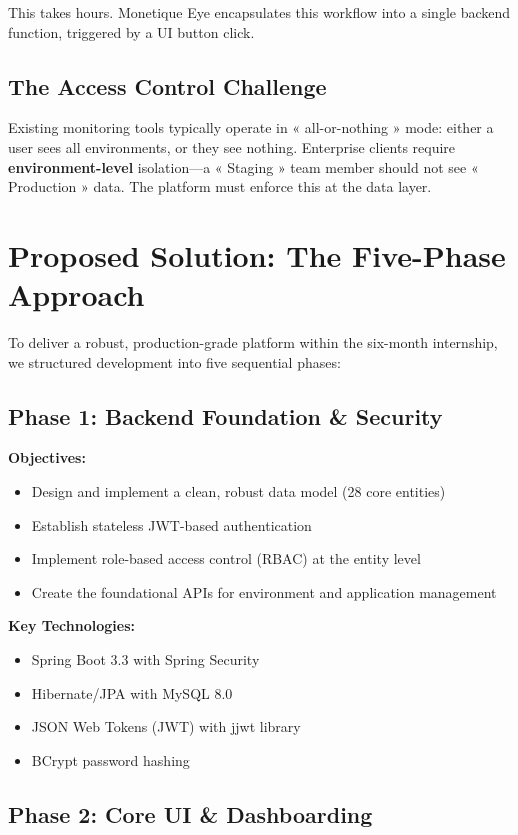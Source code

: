\documentclass[12pt,a4paper]{report}
\begin{document}
This takes hours. Monetique Eye encapsulates this workflow into a single backend function, triggered by a UI button click.

\subsection{The Access Control Challenge}

Existing monitoring tools typically operate in « all-or-nothing » mode: either a user sees all environments, or they see nothing. Enterprise clients require \textbf{environment-level} isolation—a « Staging » team member should not see « Production » data. The platform must enforce this at the data layer.

\section{Proposed Solution: The Five-Phase Approach}

To deliver a robust, production-grade platform within the six-month internship, we structured development into five sequential phases:

\subsection{Phase 1: Backend Foundation \& Security}

\textbf{Objectives:}
\begin{itemize}
  \item Design and implement a clean, robust data model (28 core entities)
  \item Establish stateless JWT-based authentication
  \item Implement role-based access control (RBAC) at the entity level
  \item Create the foundational APIs for environment and application management
\end{itemize}

\textbf{Key Technologies:}
\begin{itemize}
  \item Spring Boot 3.3 with Spring Security
  \item Hibernate/JPA with MySQL 8.0
  \item JSON Web Tokens (JWT) with jjwt library
  \item BCrypt password hashing
\end{itemize}

\subsection{Phase 2: Core UI \& Dashboarding}
\end{document}
